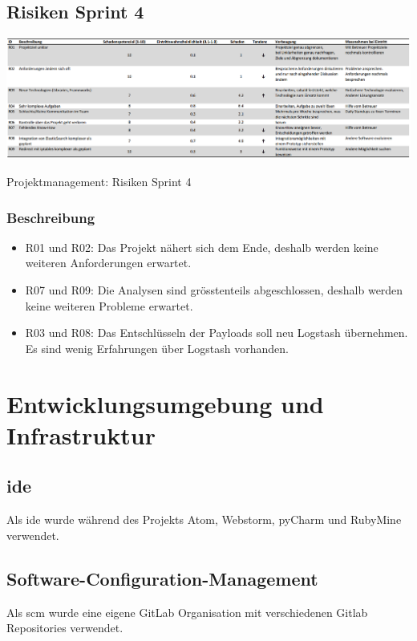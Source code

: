 \begin{landscape}
  \subsection{Risiken Sprint 4}
  	\begin{table}[H]		
		\includegraphics[width=\linewidth, keepaspectratio]{risiken/Risiken-Sprint-4.png}
		\caption{Projektmanagement: Risiken Sprint 4}
	\end{table}
	
	\subsubsection{Beschreibung}
	\begin{itemize}
		\item R01 und R02: Das Projekt nähert sich dem Ende, deshalb werden keine weiteren Anforderungen erwartet.
		\item R07 und R09: Die Analysen sind grösstenteils abgeschlossen, deshalb werden keine weiteren Probleme erwartet.
		\item R03 und R08: Das Entschlüsseln der Payloads soll neu Logstash übernehmen. Es sind wenig Erfahrungen über Logstash vorhanden.
	\end{itemize}		
	
  	\vfill
\end{landscape}

\section{Entwicklungsumgebung und Infrastruktur}

\subsection{\gls{ide}}
Als \gls{ide} wurde während des Projekts Atom, Webstorm, pyCharm und RubyMine verwendet.

\subsection{Software-Configuration-Management}
Als \gls{scm} wurde eine eigene GitLab Organisation mit verschiedenen Gitlab 
Repositories verwendet.


